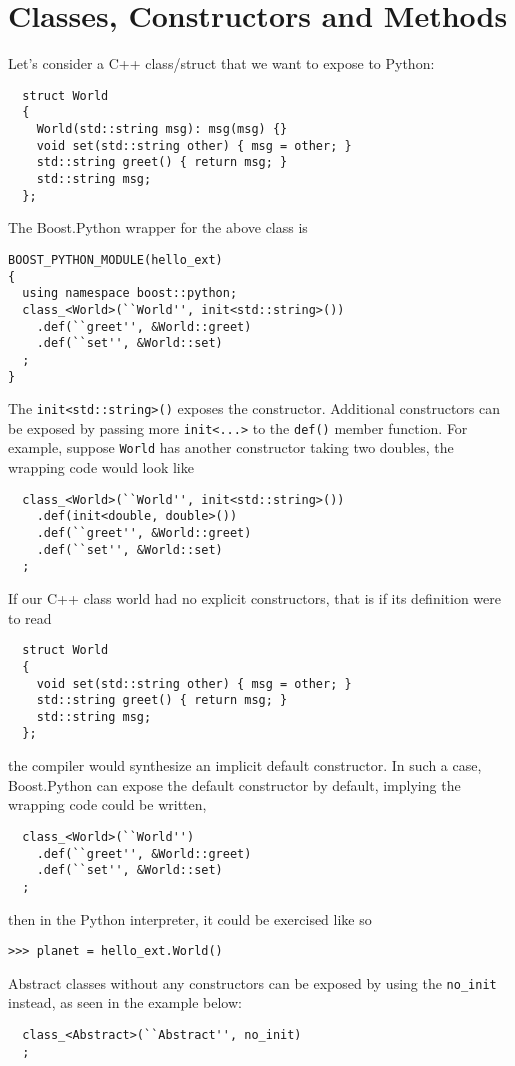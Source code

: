 \section{Classes, Constructors and Methods}
Let's consider a C++ class/struct that we want to expose to Python:
\begin{verbatim}
  struct World
  {
    World(std::string msg): msg(msg) {}
    void set(std::string other) { msg = other; }
    std::string greet() { return msg; }
    std::string msg;
  };
\end{verbatim}
The Boost.Python wrapper for the above class is
\begin{verbatim}
BOOST_PYTHON_MODULE(hello_ext)
{
  using namespace boost::python;
  class_<World>(``World'', init<std::string>())
    .def(``greet'', &World::greet)
    .def(``set'', &World::set)
  ;
}
\end{verbatim}
The \verb|init<std::string>()| exposes the constructor. Additional constructors can be exposed by passing more \verb|init<...>| to the \verb|def()| member function. For example, suppose \verb|World| has another constructor taking two doubles, the wrapping code would look like
\begin{verbatim}
  class_<World>(``World'', init<std::string>())
    .def(init<double, double>())
    .def(``greet'', &World::greet)
    .def(``set'', &World::set)
  ;
\end{verbatim}
If our C++ class world had no explicit constructors, that is if its definition were to read
\begin{verbatim}
  struct World
  {
    void set(std::string other) { msg = other; }
    std::string greet() { return msg; }
    std::string msg;
  };
\end{verbatim}
the compiler would synthesize an implicit default constructor. In such a case, Boost.Python can expose the default constructor by default, implying the wrapping code could be written,
\begin{verbatim}
  class_<World>(``World'')
    .def(``greet'', &World::greet)
    .def(``set'', &World::set)
  ;
\end{verbatim}
then in the Python interpreter, it could be exercised like so
\begin{verbatim}
>>> planet = hello_ext.World()
\end{verbatim}
Abstract classes without any constructors can be exposed by using the \verb|no_init| instead, as seen in the example below:
\begin{verbatim}
  class_<Abstract>(``Abstract'', no_init)
  ;
\end{verbatim}

